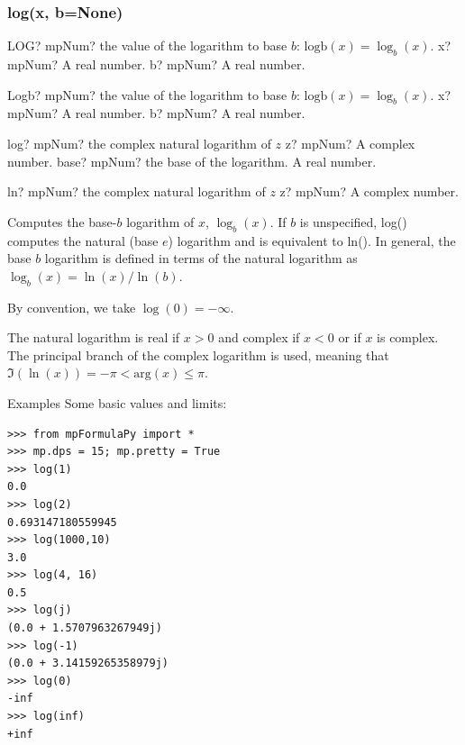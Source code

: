 \subsubsection{log(x, b=None)}

\begin{mpFunctionsExtract}
	\mpWorksheetFunctionTwoNotImplemented
	{LOG? mpNum? the value of the logarithm  to base $b$: $\text{logb}(x) = \log_{b}(x)$.}
	{x? mpNum? A real number.}
	{b? mpNum? A real number.}
\end{mpFunctionsExtract}


\begin{mpFunctionsExtract}
	\mpFunctionTwo
	{Logb? mpNum? the value of the logarithm  to base $b$: $\text{logb}(x) = \log_{b}(x)$.}
	{x? mpNum? A real number.}
	{b? mpNum? A real number.}
\end{mpFunctionsExtract}


\begin{mpFunctionsExtract}
	\mpFunctionTwo
	{log? mpNum? the complex natural logarithm of $z$}
	{z? mpNum? A complex number.}
	{base? mpNum? the base of the logarithm. A real number.}	
\end{mpFunctionsExtract}


\begin{mpFunctionsExtract}
	\mpFunctionOne
	{ln? mpNum? the complex natural logarithm of $z$}
	{z? mpNum? A complex number.}
\end{mpFunctionsExtract}


Computes the base-$b$ logarithm of $x$, $\log_b(x)$. If $b$ is unspecified, log() computes the natural (base $e$) logarithm and is equivalent to ln(). In general, the base $b$ logarithm is defined in terms of the natural logarithm as $\log_b(x)=\ln(x)/\ln(b)$.

\vpara
By convention, we take $\log(0)=-\infty$.

\vpara
The natural logarithm is real if $x>0$ and complex if $x<0$ or if $x$ is complex. The principal branch of the complex logarithm is used, meaning that $\Im(\ln(x))=-\pi<\text{arg}(x) \le \pi$.

\vpara
Examples
Some basic values and limits:

\begin{lstlisting}
>>> from mpFormulaPy import *
>>> mp.dps = 15; mp.pretty = True
>>> log(1)
0.0
>>> log(2)
0.693147180559945
>>> log(1000,10)
3.0
>>> log(4, 16)
0.5
>>> log(j)
(0.0 + 1.5707963267949j)
>>> log(-1)
(0.0 + 3.14159265358979j)
>>> log(0)
-inf
>>> log(inf)
+inf
\end{lstlisting}


